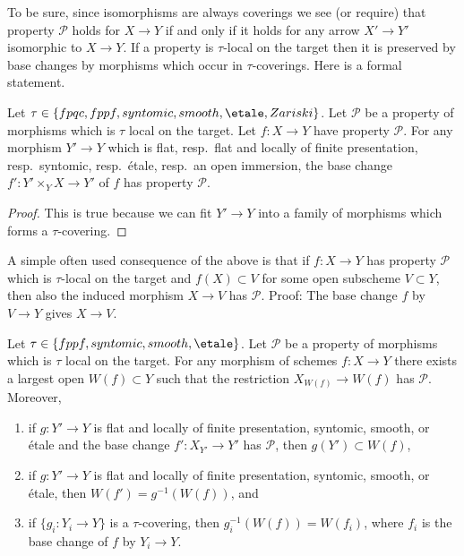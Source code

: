 \noindent
To be sure, since isomorphisms are always coverings
we see (or require) that property $\mathcal{P}$ holds for $X \to Y$
if and only if it holds for any arrow $X' \to Y'$ isomorphic to $X \to Y$.
If a property is $\tau$-local on the target then it is preserved
by base changes by morphisms which occur in $\tau$-coverings. Here
is a formal statement.

\begin{lemma}
\label{lemma-pullback-property-local-target}
Let $\tau \in \{fpqc, fppf, syntomic, smooth, \etale, Zariski\}$.
Let $\mathcal{P}$ be a property of morphisms which is $\tau$ local
on the target. Let $f : X \to Y$ have property $\mathcal{P}$.
For any morphism $Y' \to Y$ which is
flat, resp.\ flat and locally of finite presentation, resp.\ syntomic,
resp.\ \'etale, resp.\ an open immersion, the base change
$f' : Y' \times_Y X \to Y'$ of $f$ has property $\mathcal{P}$.
\end{lemma}

\begin{proof}
This is true because we can fit $Y' \to Y$ into a family of
morphisms which forms a $\tau$-covering.
\end{proof}

\noindent
A simple often used consequence of the above is that if
$f : X \to Y$ has property $\mathcal{P}$ which is $\tau$-local
on the target and $f(X) \subset V$
for some open subscheme $V \subset Y$, then also the induced
morphism $X \to V$ has $\mathcal{P}$. Proof: The base change
$f$ by $V \to Y$ gives $X \to V$.

\begin{lemma}
\label{lemma-largest-open-of-the-base}
Let $\tau \in \{fppf, syntomic, smooth, \etale\}$.
Let $\mathcal{P}$ be a property of morphisms which is $\tau$ local
on the target. For any morphism of schemes $f : X \to Y$ there exists
a largest open $W(f) \subset Y$ such that the restriction
$X_{W(f)} \to W(f)$ has $\mathcal{P}$. Moreover,
\begin{enumerate}
\item if $g : Y' \to Y$ is flat and locally of finite presentation,
syntomic, smooth, or \'etale and the base change $f' : X_{Y'} \to Y'$
has $\mathcal{P}$, then $g(Y') \subset W(f)$,
\item if $g : Y' \to Y$ is flat and locally of finite presentation,
syntomic, smooth, or \'etale, then $W(f') = g^{-1}(W(f))$, and
\item if $\{g_i : Y_i \to Y\}$ is a $\tau$-covering, then
$g_i^{-1}(W(f)) = W(f_i)$, where $f_i$ is the base change of $f$
by $Y_i \to Y$.
\end{enumerate}
\end{lemma}

